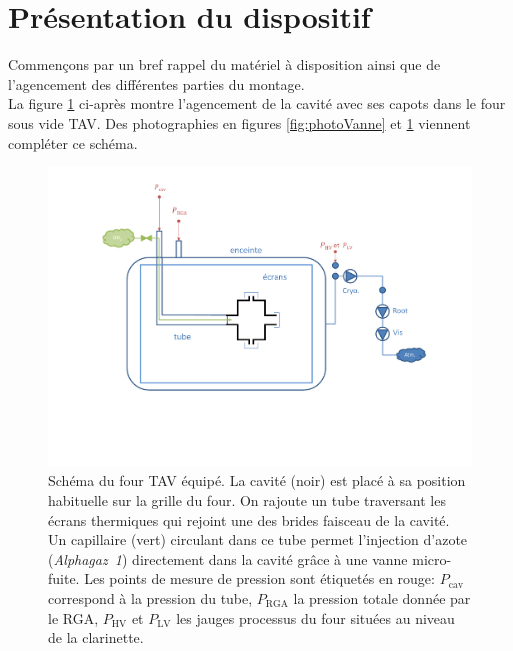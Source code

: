 \section{Présentation du dispositif}
Commençons par un bref rappel du matériel à disposition ainsi que de l'agencement des différentes parties du montage.\\
La figure \ref{fig:schemaFour} ci-après montre l'agencement de la cavité avec ses capots dans le four sous vide TAV. Des photographies en figures \ref{fig:photoVanne} et \ref{fig:schemaFour} viennent compléter ce schéma.
\begin{figure}
    \centering
    \includegraphics[trim = 3.7cm 4.3cm 3.2cm 0.9cm, clip, width=\textwidth]{Figures/schemaFour.pdf}%
    \caption[Schéma du four TAV équipé.]{Schéma du four TAV équipé. La cavité (noir) est placé à sa position habituelle sur la grille du four. On rajoute un tube traversant les écrans thermiques qui rejoint une des brides faisceau de la cavité. Un capillaire (vert) circulant dans ce tube permet l'injection d'azote (\textit{Alphagaz~1}) directement dans la cavité grâce à une vanne micro-fuite. Les points de mesure de pression sont étiquetés en rouge: $P_\text{cav}$ correspond à la pression du tube, $P_\text{RGA}$ la pression totale donnée par le RGA, $P_\text{HV}$ et $P_\text{LV}$ les jauges processus du four situées au niveau de la clarinette.}
    \label{fig:schemaFour}
\end{figure}
